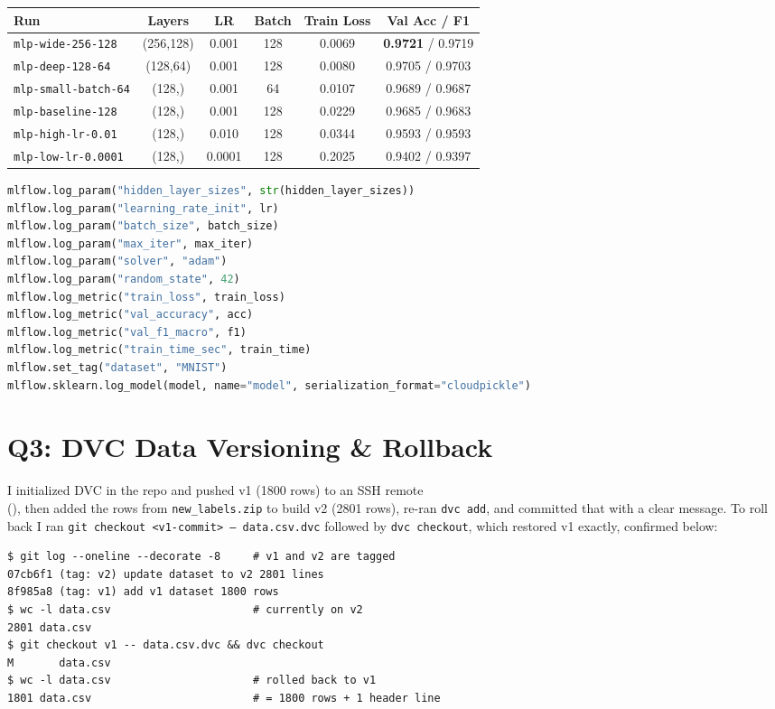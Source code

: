 \documentclass[10pt,a4paper]{article}
\begin{document}
\begin{center}
\small
\begin{tabular}{lccccc}
\toprule
\textbf{Run} & \textbf{Layers} & \textbf{LR} & \textbf{Batch} & \textbf{Train Loss} & \textbf{Val Acc / F1} \\
\midrule
\texttt{mlp-wide-256-128} & (256,128) & 0.001 & 128 & 0.0069 & \textbf{0.9721} / 0.9719 \\
\texttt{mlp-deep-128-64}  & (128,64)  & 0.001 & 128 & 0.0080 & 0.9705 / 0.9703 \\
\texttt{mlp-small-batch-64} & (128,)  & 0.001 & 64  & 0.0107 & 0.9689 / 0.9687 \\
\texttt{mlp-baseline-128}   & (128,)  & 0.001 & 128 & 0.0229 & 0.9685 / 0.9683 \\
\texttt{mlp-high-lr-0.01}   & (128,)  & 0.010 & 128 & 0.0344 & 0.9593 / 0.9593 \\
\texttt{mlp-low-lr-0.0001}  & (128,)  & 0.0001& 128 & 0.2025 & 0.9402 / 0.9397 \\
\bottomrule
\end{tabular}
\end{center}

\begin{lstlisting}[language=Python]
mlflow.log_param("hidden_layer_sizes", str(hidden_layer_sizes))
mlflow.log_param("learning_rate_init", lr)
mlflow.log_param("batch_size", batch_size)
mlflow.log_param("max_iter", max_iter)
mlflow.log_param("solver", "adam")
mlflow.log_param("random_state", 42)
mlflow.log_metric("train_loss", train_loss)
mlflow.log_metric("val_accuracy", acc)
mlflow.log_metric("val_f1_macro", f1)
mlflow.log_metric("train_time_sec", train_time)
mlflow.set_tag("dataset", "MNIST")
mlflow.sklearn.log_model(model, name="model", serialization_format="cloudpickle")
\end{lstlisting}

\section*{Q3: DVC Data Versioning \& Rollback}
I initialized DVC in the repo and pushed v1 (1800 rows) to an SSH remote\\
(), then added the rows from \texttt{new\_labels.zip} to build v2 (2801 rows), re-ran \texttt{dvc add}, and committed that with a clear message. To roll back I ran \texttt{git checkout <v1-commit> -- data.csv.dvc} followed by \texttt{dvc checkout}, which restored v1 exactly, confirmed below:
\begin{lstlisting}
$ git log --oneline --decorate -8     # v1 and v2 are tagged
07cb6f1 (tag: v2) update dataset to v2 2801 lines
8f985a8 (tag: v1) add v1 dataset 1800 rows
$ wc -l data.csv                      # currently on v2
2801 data.csv
$ git checkout v1 -- data.csv.dvc && dvc checkout
M       data.csv
$ wc -l data.csv                      # rolled back to v1
1801 data.csv                         # = 1800 rows + 1 header line
\end{lstlisting}
\end{document}
